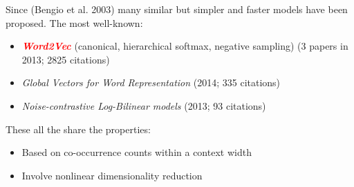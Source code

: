 \documentclass[xcolor=x11names,compress,ignorenonframetext,10pt]{beamer}
\renewcommand{\(}{\begin{columns}}
\renewcommand{\)}{\end{columns}}
\newcommand{\<}[1]{\begin{column}{#1}}
\renewcommand{\>}{\end{column}}
\def\refcolor{DodgerBlue4}
\newcommand{\refer}[1]{({\color{\refcolor}#1})}
\newcommand{\redemphasis}[1]{\textbf{\textit{\textcolor{red}{#1}}}}
\begin{document}
\begin{frame}
Since \refer{Bengio et al. 2003} many similar but simpler and faster models have been proposed. The most well-known:
\begin{itemize}
  \item \redemphasis{Word2Vec} (canonical, hierarchical softmax, negative sampling) (3 papers in 2013; 2825 citations)
  \item \textit{Global Vectors for Word Representation} (2014; 335 citations)
  \item \textit{Noise-contrastive Log-Bilinear models} (2013; 93 citations)
\end{itemize}

These all the share the properties:
\begin{itemize}
  \item Based on co-occurrence counts within a context width
  \item Involve nonlinear dimensionality reduction
\end{itemize}
\end{frame}
\end{document}
